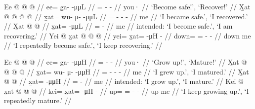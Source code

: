 \documentclass[12pt,letterpaper,oneside,article]{memoir}
\begin{document}
\pex\label{ex:intro-conj-rep-safe}%
\a\label{ex:intro-conj-rep-safe-imp}%
%
\begingl
	\gla	Ee @  @ {} @ {} //
	\glb	ee= g̱a-  -μμL //
	\glc	{}= -  - //
	\gld	you·  {} {} //
	\glft	‘Become safe!’, ‘Recover!’
		//
\endgl
\a\label{ex:intro-conj-rep-safe-pfv}%
%
\begingl
	\gla	X̱at @  @ {} @ {} @ {} //
	\glb	x̱at= wu- μ-  -μμL //
	\glc	{}= - -  - //
	\gld	me  {} {} {} //
	\glft	‘I became safe.’, ‘I recovered.’
		//
\endgl
\a\label{ex:intro-conj-rep-safe-impfv}%
\ljudge{*}%
%
\begingl
	\gla	X̱at @  @ {} //
	\glb	x̱at=  -μμL //
	\glc	{}=  - //
	\gld	me  {} //
	\glft	intended: ‘I become safe.’, ‘I am recovering.’
		//
\endgl
\a\label{ex:intro-conj-rep-safe-repimpfv}%
%
\begingl
	\gla	Yei @ x̱at @  @ {} @ {} //
	\glb	yei= x̱at=  -μH - //
	\glc	down= =  - - //
	\gld	down\• me  {} {} //
	\glft	‘I repeatedly become safe.’, ‘I keep recovering.’
		//
\endgl
\xe

\pex\label{ex:intro-conj-rep-grow}%
\a\label{ex:intro-conj-rep-grow-imp}%
%
\begingl
	\gla	Ee @  @ {} @ {} //
	\glb	ee= ga-  -μμH //
	\glc	{}= -  - //
	\gld	you·  {} {} //
	\glft	‘Grow up!’, ‘Mature!’
		//
\endgl
\a\label{ex:intro-conj-rep-grow-pfv}%
%
\begingl
	\gla	X̱at @  @ {} @ {} @ {} //
	\glb	x̱at= wu- μ-  -μμH //
	\glc	{}= - -  - //
	\gld	me  {} {} {} //
	\glft	‘I grew up.’, ‘I matured.’
		//
\endgl
\a\label{ex:intro-conj-rep-grow-impfv}%
\ljudge{*}%
%
\begingl
	\gla	X̱at @  @ {} //
	\glb	x̱at=  -μμH //
	\glc	{}=  - //
	\gld	me  {} //
	\glft	intended: ‘I grow up.’, ‘I mature.’
		//
\endgl
\a\label{ex:intro-conj-rep-grow-repimpfv}%
%
\begingl
	\gla	Kei @ x̱at @  @ {} @ {} //
	\glb	kei= x̱at=  -μH - //
	\glc	up= =  - - //
	\gld	up me  {} //
	\glft	‘I keep growing up.’, ‘I repeatedly mature.’
		//
\endgl
\xe
\end{document}
